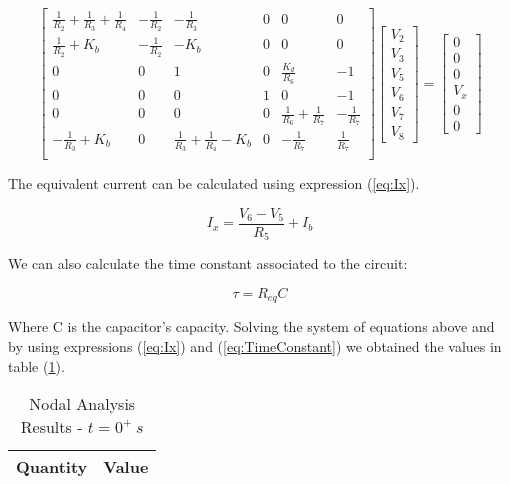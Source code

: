 \begin{equation}
  \begin{bmatrix}
    \frac{1}{R_2} + \frac{1}{R_3} + \frac{1}{R_4} & - \frac{1}{R_2} & - \frac{1}{R_3} & 0 & 0 & 0\\
    \frac{1}{R_2} + K_b & - \frac{1}{R_2} & - K_b & 0 & 0 & 0\\
    0 & 0 & 1 & 0 & \frac{K_d}{R_6} & -1\\
    0 & 0 & 0 & 1 & 0 & - 1\\
    0 & 0 & 0 & 0 & \frac{1}{R_6} + \frac{1}{R_7} & - \frac{1}{R_7}\\
    -\frac{1}{R_3} + K_b & 0 & \frac{1}{R_3} + \frac{1}{R_4} - K_b & 0 & -\frac{1}{R_7} & \frac{1}{R_7} \\ 
  \end{bmatrix}
  \begin{bmatrix}
    V_2\\
    V_3\\
    V_5\\
    V_6\\
    V_7\\
    V_8

  \end{bmatrix}
  =
  \begin{bmatrix}
    0\\
    0\\
    0\\
    V_x\\
    0\\
    0
  \end{bmatrix}
\end{equation}

The equivalent current can be calculated using expression (\ref{eq:Ix}).

\begin{equation}
  I_x = \frac{V_6 - V_5}{R_5} + I_b
  \label{eq:Ix}
\end{equation}

We can also calculate the time constant associated to the circuit:

\begin{equation}
  \tau = R_{eq} C
  \label{eq:TimeConstant}
\end{equation}

Where C is the capacitor's capacity.
Solving the system of equations above and by using expressions (\ref{eq:Ix}) and (\ref{eq:TimeConstant})
we obtained the values in table (\ref{tab:Teo2}).

\begin{table}[H]
    \centering
    \begin{tabular}{|l|r|}
    \hline    
    {\bf Quantity} & {\bf Value} \\ \hline
    
    \end{tabular}
    \caption{Nodal Analysis Results - $t = 0^{+} \:s$}
    \label{tab:Teo2}
\end{table}



